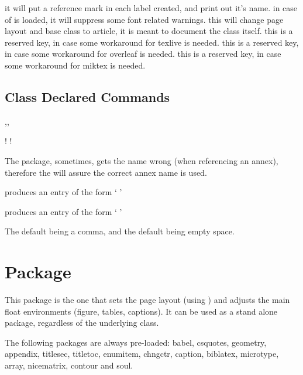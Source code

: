 \documentclass[dctools,english]{ufrgscca} %
\begin{document}
\begin{Options}
	 it will put a reference mark in each label created, and print out it's name.
	 in case of  is loaded, it will suppress some font related warnings.
	 this will change page layout and base class to article, it is meant to document the class itself.
	 this is a reserved key, in case some workaround for texlive is needed.
	 this is a reserved key, in case some workaround for overleaf is needed.
	 this is a reserved key, in case some workaround for miktex is needed.
\end{Options}

\subsection{Class Declared Commands}
\begin{Macros}{\autonameref,\annexref,\autoannexref}
	\begin{Syntax}%
		\Macro!{\autonameref}{}
		\Macro!{\autoannexref}{}
	\end{Syntax}
The  package, sometimes, gets the \Macro{\autoref}{} name wrong (when referencing an annex), therefore the  will assure the correct annex name is used.

 produces an entry of the form `   '

 produces an entry of the form `   '

The default  being a comma, and the default  being empty space.

\end{Macros}
\section{ Package}
This package is the one that sets the page layout (using ) and adjusts the main float environments (figure, tables, captions).
It can be used as a stand alone package, regardless of the underlying class.

The following packages are always pre-loaded: {\MetaFmt[Pack]\sffamily babel, csquotes, geometry, appendix, titlesec, titletoc, enumitem, chngctr, caption, biblatex, microtype, array, nicematrix, contour} and {\MetaFmt[Pack]\sffamily soul}.
\end{document}
